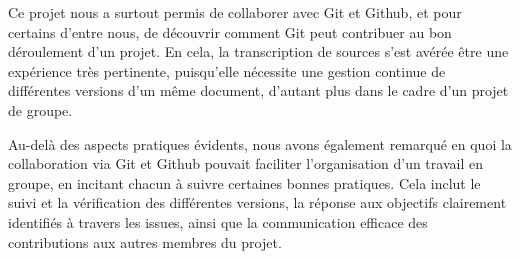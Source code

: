 \documentclass[12pt,a4paper]{article}
\begin{document}
Ce projet nous a surtout permis de collaborer avec Git et Github, et pour certains d'entre nous, de découvrir comment Git peut contribuer au bon déroulement d'un projet. En cela, la transcription de sources s'est avérée être une expérience très pertinente, puisqu'elle nécessite une gestion continue de différentes versions d'un même document, d'autant plus dans le cadre d'un projet de groupe. 

Au-delà des aspects pratiques évidents, nous avons également remarqué en quoi la collaboration via Git et Github pouvait faciliter l'organisation d'un travail en groupe, en incitant chacun à suivre certaines bonnes pratiques. Cela inclut le suivi et la vérification des différentes versions, la réponse aux objectifs clairement identifiés à travers les issues, ainsi que la communication efficace des contributions aux autres membres du projet.



\newpage

\nocite{*}
\printbibliography
\end{document}
